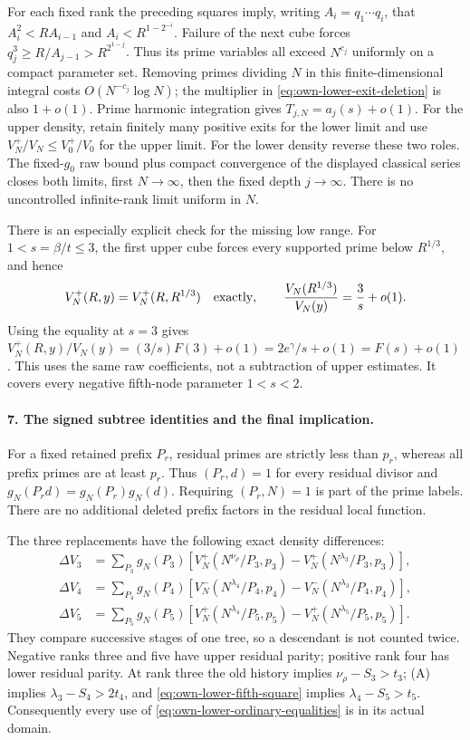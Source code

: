 For each fixed rank the preceding squares imply, writing
\(A_i=q_1\cdots q_i\), that \(A_i^2<RA_{i-1}\) and
\(A_i<R^{1-2^{-i}}\). Failure of the next cube forces
\(q_j^3\ge R/A_{j-1}>R^{2^{1-j}}\). Thus its prime variables all
exceed \(N^{c_j}\) uniformly on a compact parameter set.
Removing primes dividing \(N\) in this finite-dimensional integral
costs \(O(N^{-c_j}\log N)\); the multiplier in
\eqref{eq:own-lower-exit-deletion} is also \(1+o(1)\).
Prime harmonic integration gives \(T_{j,N}=a_j(s)+o(1)\).
For the upper density, retain finitely many positive exits for the
lower limit and use \(V_N^+/V_N\le V_0^+/V_0\) for the upper limit.
For the lower density reverse these two roles.
The fixed-\(g_0\) raw bound plus compact convergence of the displayed
classical series closes both limits, first \(N\to\infty\), then the
fixed depth \(j\to\infty\). There is no uncontrolled infinite-rank
limit uniform in \(N\).

There is an especially explicit check for the missing low range.
For \(1<s=\beta/t\le3\), the first upper cube forces every supported
prime below \(R^{1/3}\), and hence
\[
 V_N^+(R,y)=V_N^+(R,R^{1/3})\quad\hbox{exactly},\qquad
 \frac{V_N(R^{1/3})}{V_N(y)}=\frac3s+o(1).
\]
Using the equality at \(s=3\) gives
\(V_N^+(R,y)/V_N(y)=(3/s)F(3)+o(1)=2e^\gamma/s+o(1)=F(s)+o(1)\).
This uses the same raw coefficients, not a subtraction of upper
estimates. It covers every negative fifth-node parameter \(1<s<2\).

\paragraph{7. The signed subtree identities and the final implication.}
For a fixed retained prefix \(P_r\), residual primes are strictly less
than \(p_r\), whereas all prefix primes are at least \(p_r\).
Thus \((P_r,d)=1\) for every residual divisor and
\(g_N(P_rd)=g_N(P_r)g_N(d)\). Requiring \((P_r,N)=1\) is part of the
prime labels. There are no additional deleted prefix factors in the
residual local function.

The three replacements have the following exact density differences:
\begin{align}
 \Delta V_3&=\sum_{P_3}g_N(P_3)
  [V_N^+(N^{\nu_\rho}/P_3,p_3)-V_N^+(N^{\lambda_3}/P_3,p_3)],\nonumber\\
 \Delta V_4&=\sum_{P_4}g_N(P_4)
  [V_N^-(N^{\lambda_4}/P_4,p_4)-V_N^-(N^{\lambda_3}/P_4,p_4)],\label{eq:own-lower-subtree-telescope}\\
 \Delta V_5&=\sum_{P_5}g_N(P_5)
  [V_N^+(N^{\lambda_4}/P_5,p_5)-V_N^+(N^{\lambda_5}/P_5,p_5)].\nonumber
\end{align}
They compare successive stages of one tree, so a descendant is not
counted twice. Negative ranks three and five have upper residual
parity; positive rank four has lower residual parity. At rank three
the old history implies \(\nu_\rho-S_3>t_3\); (A) implies
\(\lambda_3-S_4>2t_4\), and
\eqref{eq:own-lower-fifth-square} implies \(\lambda_4-S_5>t_5\).
Consequently every use of \eqref{eq:own-lower-ordinary-equalities}
is in its actual domain.

